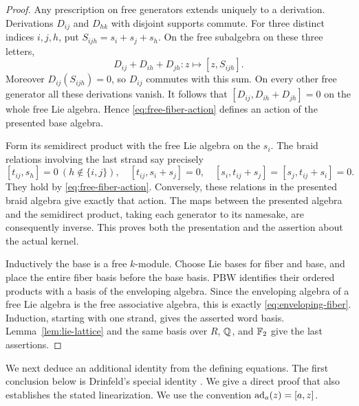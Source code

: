 \begin{proof}
Any prescription on free generators extends uniquely to a derivation.
Derivations \(D_{ij}\) and \(D_{hk}\) with disjoint supports commute.
For three distinct indices \(i,j,h\), put
\(S_{ijh}=s_i+s_j+s_h\).  On the free subalgebra on these three letters,
\[
 D_{ij}+D_{ih}+D_{jh}:z\longmapsto[z,S_{ijh}].
\]
Moreover \(D_{ij}(S_{ijh})=0\), so \(D_{ij}\) commutes with this sum.
On every other free generator all these derivations vanish.  It
follows that \([D_{ij},D_{ih}+D_{jh}]=0\) on the whole free Lie
algebra.  Hence \eqref{eq:free-fiber-action} defines an action of the
presented base algebra.

Form its semidirect product with the free Lie algebra on the \(s_i\).
The braid relations involving the last strand say precisely
\[
 [t_{ij},s_h]=0\ (h\notin\{i,j\}),\quad
 [t_{ij},s_i+s_j]=0,\quad
 [s_i,t_{ij}+s_j]=[s_j,t_{ij}+s_i]=0.
\]
They hold by \eqref{eq:free-fiber-action}.  Conversely, these relations
in the presented braid algebra give exactly that action.  The maps
between the presented algebra and the semidirect product, taking each
generator to its namesake, are consequently inverse.  This proves
both the presentation and the assertion about the actual kernel.

Inductively the base is a free \(k\)-module.  Choose Lie bases for
fiber and base, and place the entire fiber basis before the base
basis.  PBW identifies their ordered products with a basis of the
enveloping algebra.  Since the enveloping algebra of a free Lie
algebra is the free associative algebra, this is exactly
\eqref{eq:enveloping-fiber}.  Induction, starting with one strand,
gives the asserted word basis.  Lemma~\ref{lem:lie-lattice} and the
same basis over \(R\), \(\mathbb Q\), and \({\mathbb F_2}\) give the last assertions.
\end{proof}

We next deduce an additional identity from the defining equations.
The first conclusion below is Drinfeld's special identity
\cite[Proposition~5.7]{Drinfeld}.  We give a direct proof that also
establishes the stated linearization.  We use the convention
\(\operatorname{ad}_a(z)=[a,z]\).

